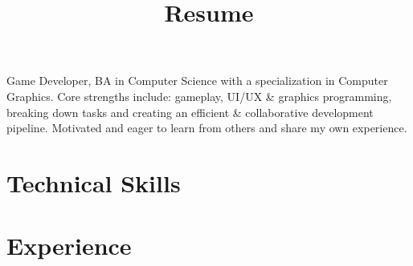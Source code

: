 \documentclass[11pt,a4paper,sans]{moderncv}        %
\title{Resume}                               %
\begin{document}
\makecvtitle
Game Developer, BA in Computer Science with a specialization in Computer Graphics. Core strengths include: gameplay, UI/UX \& graphics programming, breaking down tasks and creating an efficient \& collaborative development pipeline. Motivated and eager to learn from others and share my own experience.

\section{Technical Skills}

\section{Experience}
\end{document}

